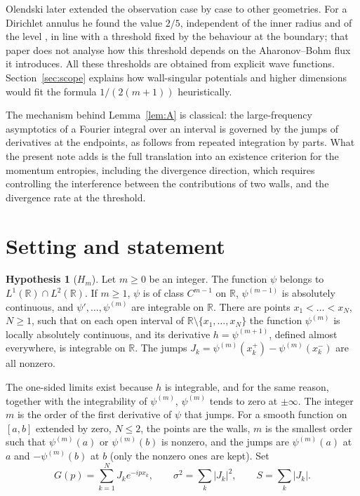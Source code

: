 \documentclass[11pt,a4paper]{article}
\theoremstyle{definition}
\newtheorem{hypothesis}[theorem]{Hypothesis}
\theoremstyle{plain}
\newcommand{\R}{\mathbb{R}}
\begin{document}
Olendski later extended the observation case by case to other geometries. For
a Dirichlet annulus he found the value $2/5$,
independent of the inner radius and of the level \cite{Olendski2022}, in line
with a threshold fixed by the behaviour at the boundary; that paper does not
analyse how this threshold depends on the Aharonov--Bohm flux it introduces.
All these thresholds are obtained from explicit wave functions.
Section~\ref{sec:scope} explains how wall-singular potentials and higher
dimensions would fit the formula $1/(2(m+1))$ heuristically.

The mechanism behind Lemma~\ref{lem:A} is classical: the large-frequency
asymptotics of a Fourier integral over an interval is governed by the jumps of
derivatives at the endpoints, as follows from repeated integration by parts.
What the present note adds is the full translation into an existence
criterion for the momentum entropies, including the divergence direction,
which requires controlling the interference between the contributions of two
walls, and the divergence rate at the threshold.

\section{Setting and statement}
\begin{hypothesis}[$H_m$]
Let $m\ge0$ be an integer. The function $\psi$ belongs to
$L^1(\R)\cap L^2(\R)$. If $m\ge1$, $\psi$ is of class $C^{m-1}$ on $\R$,
$\psi^{(m-1)}$ is absolutely continuous, and $\psi',\dots,\psi^{(m)}$ are
integrable on $\R$. There are points $x_1<\dots<x_N$, $N\ge1$, such that on
each open interval of $\R\setminus\{x_1,\dots,x_N\}$ the function
$\psi^{(m)}$ is locally absolutely continuous, and its derivative
$h=\psi^{(m+1)}$, defined almost everywhere, is integrable on $\R$. The jumps
$J_k=\psi^{(m)}(x_k^+)-\psi^{(m)}(x_k^-)$ are all nonzero.
\end{hypothesis}

The one-sided limits exist because $h$ is integrable, and for the same reason,
together with the integrability of $\psi^{(m)}$, $\psi^{(m)}$ tends to zero at
$\pm\infty$. The integer $m$ is the order of the first derivative of $\psi$
that jumps. For a smooth function on $[a,b]$ extended by zero, $N\le2$, the
points are the walls, $m$ is the smallest order such that $\psi^{(m)}(a)$ or
$\psi^{(m)}(b)$ is nonzero, and the jumps are $\psi^{(m)}(a)$ at $a$ and
$-\psi^{(m)}(b)$ at $b$ (only the nonzero ones are kept). Set
\[
G(p)=\sum_{k=1}^NJ_ke^{-ipx_k},\qquad \sigma^2=\sum_k|J_k|^2,\qquad
S=\sum_k|J_k| .
\]
\end{document}
